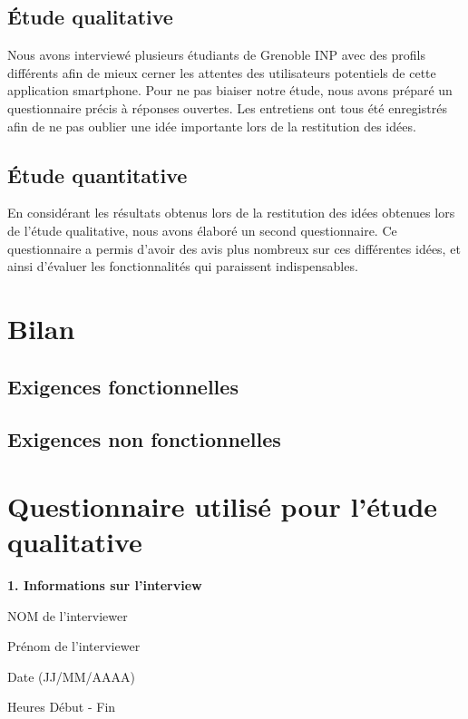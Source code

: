 \documentclass[a4paper, 11px]{article}
\begin{document}
\subsection{Étude qualitative}
Nous avons interviewé plusieurs étudiants de Grenoble INP avec des profils différents afin de mieux cerner les attentes des utilisateurs potentiels de cette application smartphone. Pour ne pas biaiser notre étude, nous avons préparé un questionnaire précis à réponses ouvertes.
Les entretiens ont tous été enregistrés afin de ne pas oublier une idée importante lors de la restitution des idées. 

\subsection{Étude quantitative}
En considérant les résultats obtenus lors de la restitution des idées obtenues lors de l'étude qualitative, nous avons élaboré un second questionnaire. Ce questionnaire a permis d'avoir des avis plus nombreux sur ces différentes idées, et ainsi d'évaluer les fonctionnalités qui paraissent indispensables.

\newpage

\section{Bilan}

\subsection{Exigences fonctionnelles}


\subsection{Exigences non fonctionnelles}


\appendix
\addappheadtotoc

\newpage

\section{Questionnaire utilisé pour l'étude qualitative}

 \textbf {\large 1. Informations sur l'interview}

	NOM de l'interviewer
	
	Prénom de l'interviewer
	
	Date (JJ/MM/AAAA)
	
	Heures Début - Fin
	
\end{document}
